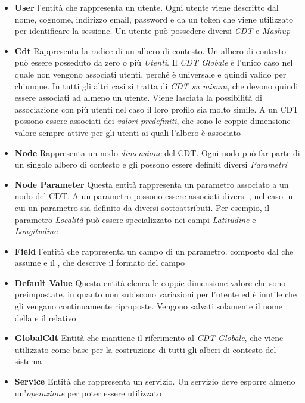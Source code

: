 \begin{itemize}
	\item \textbf{User}
	\upe l'entità che rappresenta un utente. Ogni utente viene descritto dal nome, cognome, indirizzo email, password e da un token che viene utilizzato per identificare la sessione. Un utente può possedere diversi \emph{CDT} e \emph{Mashup}
	\item \textbf{Cdt}
	Rappresenta la radice di un albero di contesto. Un albero di contesto può essere posseduto da zero o più \emph{Utenti}. Il \emph{CDT Globale} è l'unico caso nel quale non vengono associati utenti, perché è universale e quindi valido per chiunque. In tutti gli altri casi si tratta di \emph{CDT su misura}, che devono quindi essere associati ad almeno un utente. Viene lasciata la possibilità di associazione con più utenti nel caso il loro profilo sia molto simile. A un CDT possono essere associati dei \emph{valori predefiniti}, che sono le coppie dimensione-valore sempre attive per gli utenti ai quali l'albero è associato
	\item \textbf{Node}
	Rappresenta un nodo \emph{dimensione} del CDT. Ogni nodo può far parte di un singolo albero di contesto e gli possono essere definiti diversi \emph{Parametri}
	\item \textbf{Node Parameter}
	Questa entità rappresenta un parametro associato a un nodo del CDT. A un parametro possono essere associati diversi , nel caso in cui un parametro sia definito da diversi sottoattributi. Per esempio, il parametro \emph{Località} può essere specializzato nei campi \emph{Latitudine} e \emph{Longitudine}
	\item \textbf{Field}
	\upe l'entità che rappresenta un campo di un parametro. \upe composto dal  che assume e il , che descrive il formato del campo
	\item \textbf{Default Value}
	Questa entità elenca le coppie dimensione-valore che sono preimpostate, in quanto non subiscono variazioni per l'utente ed è inutile che gli vengano continuamente riproposte. Vengono salvati solamente il nome della  e il relativo 
	\item \textbf{GlobalCdt}
	Entità che mantiene il riferimento al \emph{CDT Globale}, che viene utilizzato come base per la costruzione di tutti gli alberi di contesto del sistema
	\item \textbf{Service}
	Entità che rappresenta un servizio. Un servizio deve esporre almeno un'\emph{operazione} per poter essere utilizzato

\end{itemize}
